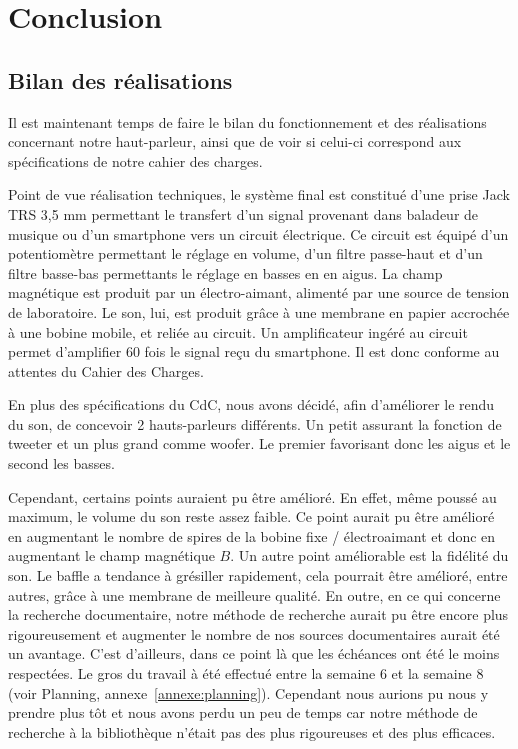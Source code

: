\chapter{Conclusion}

\section{Bilan des réalisations}

Il est maintenant temps de faire le bilan du fonctionnement et des réalisations concernant notre haut-parleur, ainsi que de voir si celui-ci correspond aux spécifications de notre cahier des charges.

Point de vue réalisation techniques, le système final est constitué d'une prise Jack TRS 3,5 mm permettant le transfert d'un signal provenant dans baladeur de musique ou d'un smartphone vers un circuit électrique. Ce circuit est équipé d'un potentiomètre permettant le réglage en volume, d'un filtre passe-haut et d'un filtre basse-bas permettants le réglage en basses en en aigus. La champ magnétique est produit par un électro-aimant, alimenté par une source de tension de laboratoire. Le son, lui, est produit grâce à une membrane en papier accrochée à une bobine mobile, et reliée au circuit. Un amplificateur ingéré au circuit permet d'amplifier 60 fois le signal reçu du smartphone. Il est donc conforme au attentes du Cahier des Charges.

En plus des spécifications du CdC, nous avons décidé, afin d'améliorer le rendu du son, de concevoir 2 hauts-parleurs différents. Un petit assurant la fonction de tweeter et un plus grand comme woofer. Le premier favorisant donc les aigus et le second les basses.

Cependant, certains points auraient pu être amélioré. En effet, même poussé au maximum, le volume du son reste assez faible.  Ce point aurait pu être amélioré en augmentant le nombre de spires de la bobine fixe / électroaimant et donc en augmentant le champ magnétique $B$.
Un autre point améliorable est la fidélité du son. Le baffle a tendance à grésiller rapidement, cela pourrait être amélioré, entre autres, grâce à une membrane de meilleure qualité.
En outre, en ce qui concerne la recherche documentaire, notre méthode de recherche aurait pu être encore plus rigoureusement et augmenter le nombre de nos sources documentaires aurait été un avantage. C'est d'ailleurs, dans ce point là que les échéances ont été le moins respectées. Le gros du travail à été effectué entre la semaine 6 et la semaine 8 (voir Planning, annexe~\ref{annexe:planning}). Cependant nous aurions pu nous y prendre plus tôt et nous avons perdu un peu de temps car notre méthode de recherche à la bibliothèque n'était pas des plus rigoureuses et des plus efficaces.

